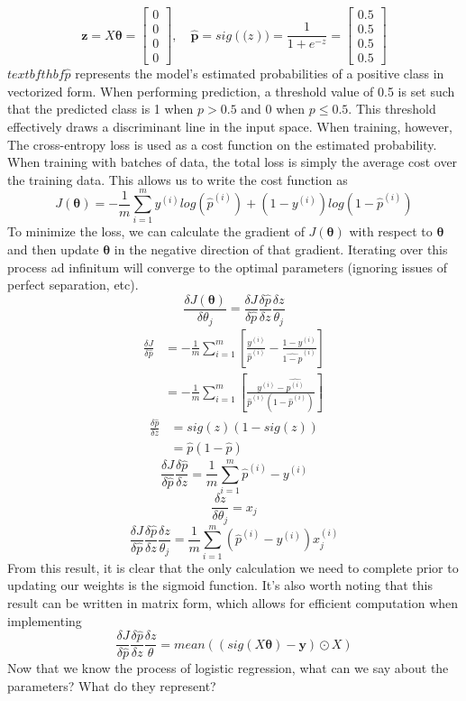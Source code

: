 \documentclass[11pt,largemargins]{homework}
\begin{document}
$$\mathbf{z}=X\mathbf{\theta}=
\begin{bmatrix}
	0\\
	0\\
	0\\
	0
\end{bmatrix},\quad\mathbf{\hat{p}}=sig(\mathbf(z))= \frac{1}{1+e^{-z}}=
\begin{bmatrix}
	0.5\\
	0.5\\
	0.5\\
	0.5
\end{bmatrix}$$
$textbfthbf{\hat{p}}$ represents the model's estimated probabilities of a positive class in vectorized form. When performing prediction, a threshold value of 0.5 is set such that the predicted class is 1 when $p>0.5$ and 0 when $p\leq 0.5$. This threshold effectively draws a discriminant line in the input space. When training, however, The cross-entropy loss is used as a cost function on the estimated probability. When training with batches of data, the total loss is simply the average cost over the training data. This allows us to write the cost function as
$$J(\mathbf{\theta})=-\frac{1}{m}\sum_{i=1}^my^{(i)}log(\hat{p}^{(i)})+(1-y^{(i)})log(1-\hat{p}^{(i)})$$
To minimize the loss, we can calculate the gradient of $J(\mathbf{\theta})$ with respect to $\mathbf{\theta}$ and then update $\mathbf{\theta}$ in the negative direction of that gradient. Iterating over this process ad infinitum will converge to the optimal parameters (ignoring issues of perfect separation, etc).
$$\frac{\delta J(\mathbf{\theta})}{\delta \theta_j}=\frac{\delta J}{\delta \hat{p}}\frac{\delta \hat{p}}{\delta z}\frac{\delta z}{\theta_j}$$
\begin{align*}
	\frac{\delta J}{\delta\hat{p}} &= -\frac{1}{m}\sum_{i=1}^m\left[\frac{y^{(i)}}{\hat{p}^{(i)}}-\frac{1-y^{(i)}}{\hat{1-p}^{(i)}}\right]\\
	&= -\frac{1}{m}\sum_{i=1}^m\left[ \frac{y^{(i)}-\hat{p^{(i)}}}{\hat{p}^{(i)}(1-\hat{p}^{(i)})}\right]
\end{align*}
\begin{align*}
	\frac{\delta\hat{p}}{\delta z}&= sig(z)(1-sig(z))\\
	&= \hat{p}(1-\hat{p})
\end{align*}
$$\frac{\delta J}{\delta\hat{p}}\frac{\delta\hat{p}}{\delta z}=\frac{1}{m}\sum_{i=1}^m\hat{p}^{(i)}-y^{(i)}$$
$$\frac{\delta z}{\delta\theta_j}=x_j$$
$$\frac{\delta J}{\delta \hat{p}}\frac{\delta \hat{p}}{\delta z}\frac{\delta z}{\theta_j}=\frac{1}{m}\sum_{i=1}^m(\hat{p}^{(i)}-y^{(i)})x_j^{(i)}$$  
From this result, it is clear that the only calculation we need to complete prior to updating our weights is the sigmoid function.
It's also worth noting that this result can be written in matrix form, which allows for efficient computation when implementing
$$\frac{\delta J}{\delta \hat{p}}\frac{\delta \hat{p}}{\delta z}\frac{\delta z}{\theta}=mean((sig(X\mathbf{\theta})-\mathbf{y})\odot X)$$
Now that we know the process of logistic regression, what can we say about the parameters? What do they represent?
\end{document}
